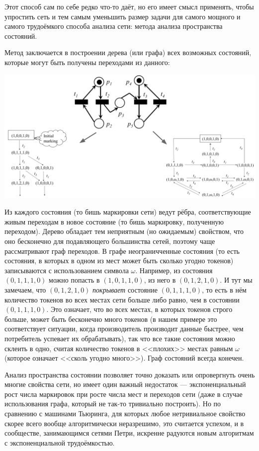 \documentclass[a5paper]{article}
\begin{document}
Этот способ сам по себе редко что-то даёт, но его имеет смысл применять, чтобы упростить сеть и тем самым уменьшить размер задачи для самого мощного и самого трудоёмкого способа анализа сети: метода анализа пространства состояний.

Метод заключается в построении дерева (или графа) всех возможных состояний, которые могут быть получены переходами из данного:

\begin{center}
	\includegraphics[width=\textwidth]{petriStateSpaceAnalysis.png}
\end{center}

Из каждого состояния (то бишь маркировки сети) ведут рёбра, соответствующие живым переходам в новое состояние (то бишь маркировку, полученную переходом). Дерево обладает тем неприятным (но ожидаемым) свойством, что оно бесконечно для подавляющего большинства сетей, поэтому чаще рассматривают граф переходов. В графе неограничченные состояния (то есть состояния, в которых в одном из мест может быть сколько угодно токенов) записываются с использованием символа $\omega$. Например, из состояния $(0, 1, 1, 1, 0)$ можно попасть в $(1, 0, 1, 1, 0)$, из него в $(0, 1, 2, 1, 0)$. И тут мы замечаем, что $(0, 1, 2, 1, 0)$ \textit{покрывает} состояние $(0, 1, 1, 1, 0)$, то есть в нём количество токенов во всех местах сети больше либо равно, чем в состоянии $(0, 1, 1, 1, 0)$. Это означает, что во всех местах, в которых токенов строго больше, может быть бесконечно много токенов (в нашем примере это соответствует ситуации, когда производитель производит данные быстрее, чем потребитель успевает их обрабатывать), так что все такие состояния можно склеить в одно, считая количество токенов в <<плохих>> местах равным $\omega$ (которое означает <<сколь угодно много>>). Граф состояний всегда конечен.

Анализ пространства состоянии позволяет точно доказать или опровергнуть очень многие свойства сети, но имеет один важный недостаток --- экспоненциальный рост числа маркировок при росте числа мест и переходов сети (даже в случае использования графа, который не так-то тривиально построить). Но по сравнению с машинами Тьюринга, для которых любое нетривиальное свойство скорее всего вообще алгоритмически неразрешимо, это считается успехом, и в сообществе, занимающимся сетями Петри, искренне радуются новым алгоритмам с экспоненциальной трудоёмкостью.
\end{document}

